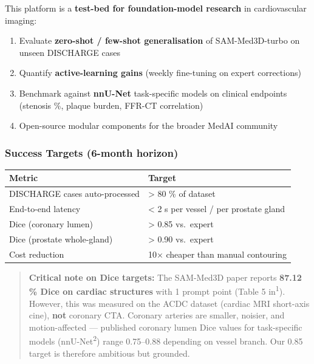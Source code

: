\documentclass[
  11pt,
]{article}
\providecommand{\tightlist}{%
  \setlength{\itemsep}{0pt}\setlength{\parskip}{0pt}}
\begin{document}
This platform is a \textbf{test-bed for foundation-model research} in
cardiovascular imaging:

\begin{enumerate}
\def\labelenumi{\arabic{enumi}.}
\tightlist
\item
  Evaluate \textbf{zero-shot / few-shot generalisation} of
  SAM-Med3D-turbo on unseen DISCHARGE cases
\item
  Quantify \textbf{active-learning gains} (weekly fine-tuning on expert
  corrections)
\item
  Benchmark against \textbf{nnU-Net} task-specific models on clinical
  endpoints (stenosis \%, plaque burden, FFR-CT correlation)
\item
  Open-source modular components for the broader MedAI community
\end{enumerate}

\subsubsection{Success Targets (6-month
horizon)}\label{success-targets-6-month-horizon}

\begin{longtable}[]{@{}ll@{}}
\toprule\noalign{}
Metric & Target \\
\midrule\noalign{}
\endhead
\bottomrule\noalign{}
\endlastfoot
DISCHARGE cases auto-processed & \textgreater{} 80 \% of dataset \\
End-to-end latency & \textless{} 2 s per vessel / per prostate gland \\
Dice (coronary lumen) & \textgreater{} 0.85 vs.~expert \\
Dice (prostate whole-gland) & \textgreater{} 0.90 vs.~expert \\
Cost reduction & 10× cheaper than manual contouring \\
\end{longtable}

\begin{quote}
\textbf{Critical note on Dice targets:} The SAM-Med3D paper reports
\textbf{87.12 \% Dice on cardiac structures} with 1 prompt point (Table
5 in\textsuperscript{1}). However, this was measured on the ACDC dataset
(cardiac MRI short-axis cine), \textbf{not} coronary CTA. Coronary
arteries are smaller, noisier, and motion-affected --- published
coronary lumen Dice values for task-specific models
(nnU-Net\textsuperscript{2}) range 0.75--0.88 depending on vessel
branch. Our 0.85 target is therefore ambitious but grounded.
\end{quote}
\end{document}
